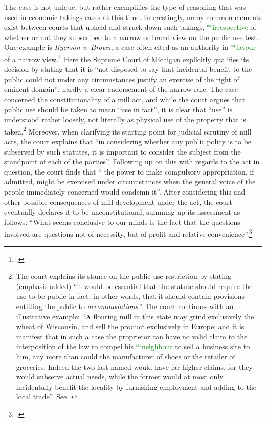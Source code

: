 \documentclass[12pt,a4paper]{book} %
\newcommand{\isr}[1]{\textcolor{green}{$^{\textrm{isr}}${#1}}}
\begin{document}
The case is not unique, but rather exemplifies the type of reasoning that was used in economic takings cases at this time. Interestingly, many common elements exist between courts that upheld and struck down such takings, \isr{irrespective} of whether or not they subscribed to a narrow or broad view on the public use test. One example is {\it Ryerson v. Brown}, a case often cited as an authority in \isr{favour} of a narrow view.\footcite{ryerson77} Here the Supreme Court of Michigan explicitly qualifies its decision by stating that it is ``not disposed to say that incidental benefit to the public could not under any circumstances justify an exercise of the right of eminent domain'', hardly a clear endorsement of the narrow rule. The case concerned the constitutionality of a mill act, and while the court argues that public use should be taken to mean ``use in fact'', it is clear that ``use'' is understood rather loosely, not literally as physical use of the property that is taken.\footnote{The court explains its stance on the public use restriction by stating (emphasis added) ``it would be essential that the statute should require the use to be public in fact; in other words, that it should contain provisions entitling the public to {\it accommodations}.'' The court continues with an illustrative example: ``A flouring mill in this state may grind exclusively the wheat of Wisconsin, and sell the product exclusively in Europe; and it is manifest that in such a case the proprietor can have no valid claim to the interposition of the law to compel his \isr{neighbour} to sell a business site to him, any more than could the manufacturer of shoes or the retailer of groceries. Indeed the two last named would have far higher claims, for they would subserve actual needs, while the former would at most only incidentally benefit the locality by furnishing employment and adding to the local trade''. See \cite[336]{ryerson77}.} Moreover, when clarifying its starting point for judicial scrutiny of mill acts, the court explains that ``in considering whether any public policy is to be subserved by such statutes, it is important to consider the subject from the standpoint of each of the parties''. Following up on this with regards to the act in question, the court finds that `` the power to make compulsory appropriation, if admitted, might be exercised under circumstances when the general voice of the people immediately concerned would condemn it''. After considering this and other possible consequences of mill development under the act, the court eventually declares it to be unconstitutional, summing up its assessment as follows: ``What seems conclusive to our minds is the fact that the questions involved are questions not of necessity, but of profit and relative convenience''.\footcite[336]{ryerson77}
\end{document}
